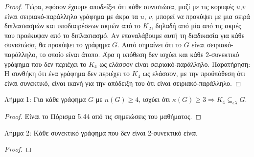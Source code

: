 \documentclass[a4paper, oneside, 11pt]{article}
\begin{document}
\begin{enumerate}
\begin{proof}
Τώρα, εφόσον έχουμε αποδείξει ότι κάθε συνιστώσα, μαζί με τις κορυφές $u$,$v$ είναι σειριακό-παράλληλο γράφημα με άκρα τα $u$, $v$, μπορεί να προκύψει με μια σειρά διπλασιασμών και υποδιαιρέσεων ακμών
από το $K_2$, δηλαδή από μία από τις ακμές που προέκυψαν από το διπλασιασμό. Αν επαναλάβουμε αυτή τη διαδικασία για κάθε συνιστώσα, θα προκύψει το γράφημα $G$. Αυτό σημαίνει ότι το $G$ είναι 
σειριακό-παράλληλο, το οποίο είναι άτοπο. Άρα η υπόθεση δεν ισχύει και κάθε 2-συνεκτικό γράφημα που δεν περιέχει το $K_4$ ως ελάσσον είναι σειριακό-παράλληλο. Παρατήρηση: Η συνθήκη ότι ένα γράφημα
δεν περιέχει το $K_4$ ως ελάσσον, με την προϋπόθεση ότι είναι συνεκτικό, είναι ικανή για την απόδειξη του ότι είναι σειριακό-παράλληλο.
	\end{proof}     
Λήμμα 1: Για κάθε γράφημα $G$ με $n(G)\geq 4$, ισχύει ότι $\kappa(G)\geq 3 \Rightarrow K_4 \subseteq_{\epsilon\lambda} G$.
	\begin{proof}
Είναι το Πόρισμα 5.44 από τις σημειώσεις του μαθήματος.
	\end{proof}
Λήμμα 2: Κάθε συνεκτικό γράφημα που δεν είναι 2-συνεκτικό είναι 
	\begin{proof}

	\end{proof}
 
\end{enumerate}
\end{document}
